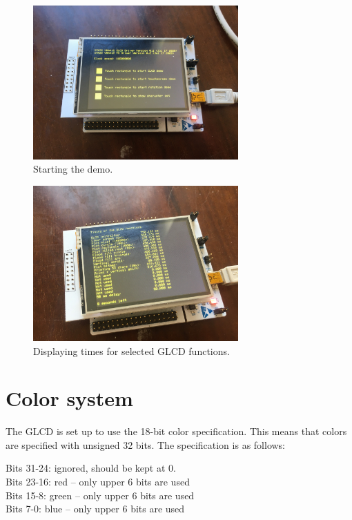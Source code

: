 \documentclass[12pt]{article}
\begin{document}
\begin{figure}[!ht]
\centering
\includegraphics[width=0.7\textwidth]{start_demo}
\caption{Starting the demo.}
\label{fig:2}
\end{figure}

\begin{figure}[!ht]
\centering
\includegraphics[width=0.7\textwidth]{times}
\caption{Displaying times for selected GLCD functions.}
\label{fig:3}
\end{figure}


\section{Color system}
The GLCD is set up to use the 18-bit color specification. This means that colors are specified with unsigned 32 bits. The specification is as follows:

Bits 31-24: ignored, should be kept at 0.\\
Bits 23-16: red -- only upper 6 bits are used\\
Bits 15-8: green -- only upper 6 bits are used\\
Bits 7-0: blue -- only upper 6 bits are used
\end{document}
